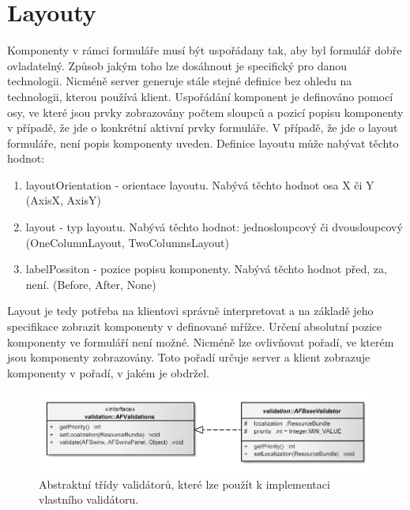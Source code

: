 \section{Layouty}
Komponenty v rámci formuláře musí být uspořádany tak, aby byl formulář dobře ovladatelný. Způsob jakým toho lze dosáhnout je specifický pro danou technologii. Nicméně server generuje stále stejné definice bez ohledu na technologii, kterou používá klient. Uspořádání komponent je definováno pomocí osy, ve které jsou prvky zobrazovány počtem sloupců a pozicí popisu komponenty v případě, že jde o konkrétní aktivní prvky formuláře. V případě, že jde o layout formuláře, není popis komponenty uveden. Definice layoutu může nabývat těchto hodnot:
\begin{enumerate}
\item layoutOrientation - orientace layoutu. Nabývá těchto hodnot osa X či Y (AxisX, AxisY)
\item layout - typ layoutu. Nabývá těchto hodnot: jednosloupcový či dvousloupcový (OneColumnLayout, TwoColumnsLayout)
\item labelPossiton - pozice popisu komponenty. Nabývá těchto hodnot před, za, není. (Before, After, None)
\end{enumerate}
Layout je tedy potřeba na klientovi správně interpretovat a na základě jeho specifikace zobrazit komponenty v definované mřížce. Určení absolutní pozice komponenty ve formuláří není možné. Nicméně lze ovlivňovat pořadí, ve kterém jsou komponenty zobrazovány. Toto pořadí určuje server a klient zobrazuje komponenty v pořadí, v jakém je obdržel. 
\begin{figure}[h!]
\includegraphics{images/validationModel}
\caption{Abstraktní třídy validátorů, které lze použít k implementaci vlastního validátoru.}
\label{img:validationModel}
\end{figure}

